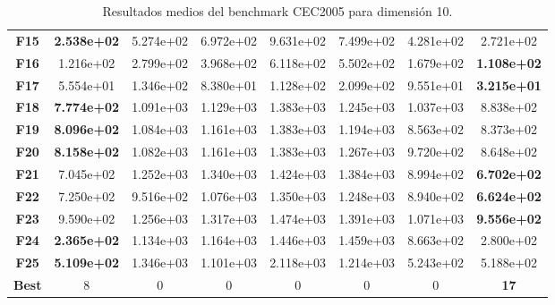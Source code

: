 \begin{table}
{\begin{tabular}{cccccccc}
		\midrule
		\textbf{F15}  &  \textbf{2.538e+02} &  5.274e+02 &  6.972e+02 &  9.631e+02 &  7.499e+02 &  4.281e+02 &  2.721e+02 \\
		\textbf{F16}  &  1.216e+02 &  2.799e+02 &  3.968e+02 &  6.118e+02 &  5.502e+02 &  1.679e+02 &  \textbf{1.108e+02} \\
		\textbf{F17}  &  5.554e+01 &  1.346e+02 &  8.380e+01 &  1.128e+02 &  2.099e+02 &  9.551e+01 &  \textbf{3.215e+01} \\
		\textbf{F18}  &  \textbf{7.774e+02} &  1.091e+03 &  1.129e+03 &  1.383e+03 &  1.245e+03 &  1.037e+03 &  8.838e+02 \\
		\textbf{F19}  &  \textbf{8.096e+02} &  1.084e+03 &  1.161e+03 &  1.383e+03 &  1.194e+03 &  8.563e+02 &  8.373e+02 \\
		\textbf{F20}  &  \textbf{8.158e+02} &  1.082e+03 &  1.161e+03 &  1.383e+03 &  1.267e+03 &  9.720e+02 &  8.648e+02 \\
		\textbf{F21}  &  7.045e+02 &  1.252e+03 &  1.340e+03 &  1.424e+03 &  1.384e+03 &  8.994e+02 &  \textbf{6.702e+02} \\
		\textbf{F22}  &  7.250e+02 &  9.516e+02 &  1.076e+03 &  1.350e+03 &  1.248e+03 &  8.940e+02 &  \textbf{6.624e+02} \\
		\textbf{F23}  &  9.590e+02 &  1.256e+03 &  1.317e+03 &  1.474e+03 &  1.391e+03 &  1.071e+03 &  \textbf{9.556e+02} \\
		\textbf{F24}  &  \textbf{2.365e+02} &  1.134e+03 &  1.164e+03 &  1.446e+03 &  1.459e+03 &  8.663e+02 &  2.800e+02 \\
		\textbf{F25}  &  \textbf{5.109e+02} &  1.346e+03 &  1.101e+03 &  2.118e+03 &  1.214e+03 &  5.243e+02 &  5.188e+02 \\
		\midrule
		\textbf{Best} &          8 &          0 &          0 &          0 &          0 &          0 &         \textbf{17} \\
		\bottomrule
\end{tabular}}
	\caption{Resultados medios del benchmark CEC2005 para dimensión 10.}\label{t:resultados-10}
\end{table}

